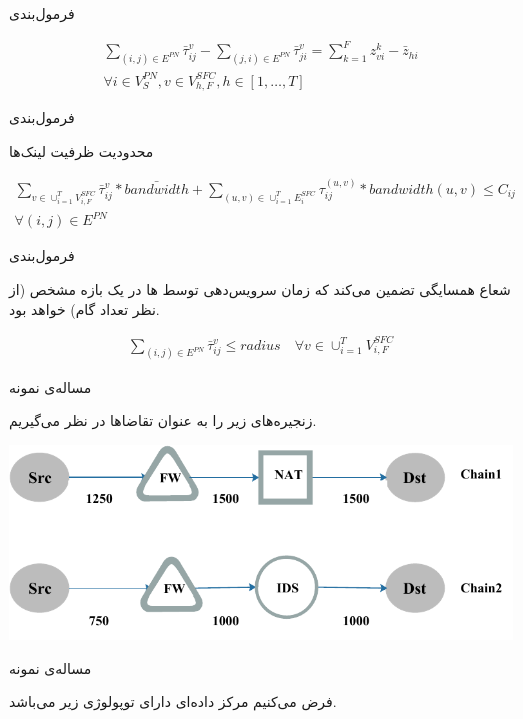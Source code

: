 \documentclass{beamer}
\begin{document}
\begin{persian}
\begin{frame}{فرمول‌بندی}
\begin{latin}
\begin{align}
        \sum_{(i,j) \in E^{PN}} \bar{\tau}_{ij}^{v} - \sum_{(j,i) \in E^{PN}} \bar{\tau}_{ji}^{v} = \sum_{k=1}^{F} z_{vi}^{k} - \bar{z}_{hi} \nonumber \\
        \forall i \in V_{S}^{PN}, v \in V_{h, F}^{SFC}, h \in [1,\ldots, T]
    \end{align}\end{latin}
\end{frame}
\begin{frame}{فرمول‌بندی}
    \par
    محدودیت ظرفیت لینک‌ها
    \begin{latin}\begin{align}
        \sum_{v \in \cup_{i=1}^{T} V_{i,F}^{SFC}} \bar{\tau}_{ij}^{v} * \bar{bandwidth} + \sum_{(u,v) \in \cup_{i=1}^{T} E_{i}^{SFC}} \tau_{ij}^{(u,v)} * bandwidth(u,v) \le C_{ij} \nonumber \\
        \forall (i, j) \in E^{PN}
    \end{align}\end{latin}
\end{frame}
\begin{frame}{فرمول‌بندی}
    \par
    شعاع همسایگی تضمین می‌کند که زمان سرویس‌دهی توسط
    ها
    در یک بازه مشخص (از نظر تعداد گام)
    خواهد بود.
    \begin{latin}\begin{align}
        \sum_{(i, j) \in E^{PN}} \bar{\tau}_{ij}^{v} \le radius
        \quad
        \forall v \in \cup_{i=1}^T V_{i, F}^{SFC}
    \end{align}\end{latin}
\end{frame}
\begin{frame}{مساله‌ی نمونه}
    \par
    زنجیره‌های زیر را به عنوان تقاضاها در نظر می‌گیریم.

    \begin{center}
        \includegraphics[scale=0.5]{../diagrams/chains.pdf}
    \end{center}
\end{frame}
\begin{frame}{مساله‌ی نمونه}
    \par
    فرض می‌کنیم مرکز داده‌ای دارای توپولوژی زیر می‌باشد.


\end{frame}
\end{persian}
\end{document}
